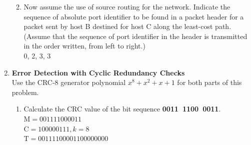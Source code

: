 \documentclass[10pt, a4paper]{article}
\begin{document}
\begin{enumerate}
\begin{enumerate}
\begin{enumerate}
            \color{black}
        \end{enumerate}
    \item Now assume the use of source routing for the network. Indicate the sequence of absolute port identifier to be found in a packet header for a packet sent by host B destined for host C along the least-cost path. (Assume that the sequence of port identifier in the header is transmitted in the order written, from left to right.)\\
        \color{blue}
        0, 2, 3, 3
        \color{black}
    \end{enumerate}
\item\mbox{}\textbf{Error Detection with Cyclic Redundancy Checks}\\
    Use the CRC-8 generator polynomial $x^8 + x^2 + x + 1$ for both parts of this problem.
    \begin{enumerate}
    \item Calculate the CRC value of the bit sequence \textbf{0011\ 1100\ 0011}.\\
        \color{blue}
        $\mbox{M} = 001111000011$\\
        $\mbox{C} = 100000111, k = 8$\\
        $\mbox{T} = 00111100001100000000$\\


\end{enumerate}
\end{enumerate}
\end{document}

